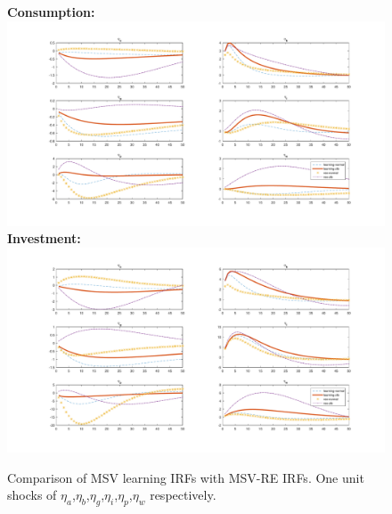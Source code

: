 \documentclass[12pt,reqno]{article}
\numberwithin{equation}{section}
\begin{document}
\begin{figure}[H]
\label{irf_msv_1}
\caption{Comparison of MSV learning IRFs with MSV-RE IRFs. One unit shocks of $\eta_a$,$\eta_b$,$\eta_g$,$\eta_i$,$\eta_p$,$\eta_w$ respectively.}
\textbf{Consumption:}\\
\includegraphics[scale=0.5]{MSV_impresp_cons_riseComp.pdf}
\textbf{Investment:}\\
\includegraphics[scale=0.5]{MSV_impresp_inv_riseComp.pdf}

\end{figure}
\end{document}

